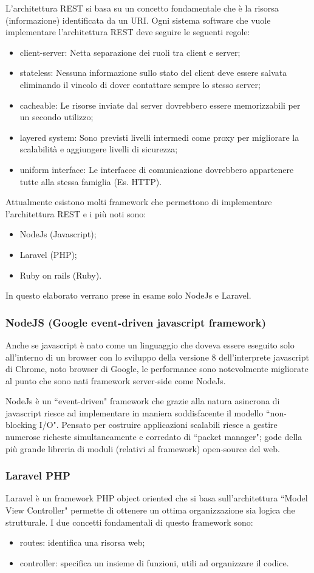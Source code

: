 L'architettura REST si basa su un concetto fondamentale che è la risorsa (informazione) identificata da un URI. Ogni sistema software che vuole implementare l'architettura REST deve seguire le seguenti regole:
\begin{itemize}
	\item client-server: Netta separazione dei ruoli tra client e server;
	\item stateless: Nessuna informazione sullo stato del client deve essere salvata eliminando il vincolo di dover contattare sempre lo stesso server;
	\item cacheable: Le risorse inviate dal server dovrebbero essere memorizzabili per un secondo utilizzo;
	\item layered system: Sono previsti livelli intermedi come proxy per migliorare la scalabilità e aggiungere livelli di sicurezza;
	\item uniform interface: Le interfacce di comunicazione dovrebbero appartenere tutte alla stessa famiglia (Es. HTTP).
\end{itemize}
Attualmente esistono molti framework che permettono di implementare l'architettura REST e i più noti sono:
\begin{itemize}
	\item NodeJs (Javascript);
	\item Laravel (PHP);
	\item Ruby on rails (Ruby).
\end{itemize}
In questo elaborato verrano prese in esame solo NodeJs e Laravel.
\subsubsection{NodeJS (Google event-driven javascript framework)}
Anche se javascript è nato come un linguaggio che doveva essere eseguito solo all'interno di un browser con lo sviluppo della versione 8 dell'interprete javascript di Chrome, noto browser di Google, le performance sono notevolmente migliorate al punto che sono nati framework server-side come NodeJs. 

NodeJs è un ``event-driven" framework che grazie alla natura asincrona di javascript riesce ad implementare in maniera soddisfacente il modello ``non-blocking I/O". Pensato per costruire applicazioni scalabili riesce a gestire numerose richeste simultaneamente e corredato di ``packet manager"; gode della più grande libreria di moduli (relativi al framework) open-source del web.


\subsubsection{Laravel PHP}
Laravel è un framework PHP object oriented che si basa sull'architettura ``Model View Controller" permette di ottenere un ottima organizzazione sia logica che strutturale. I due concetti fondamentali di questo framework sono:
\begin{itemize}
	\item routes: identifica una risorsa web;
	\item controller: specifica un insieme di funzioni, utili ad organizzare il codice.

\end{itemize}
